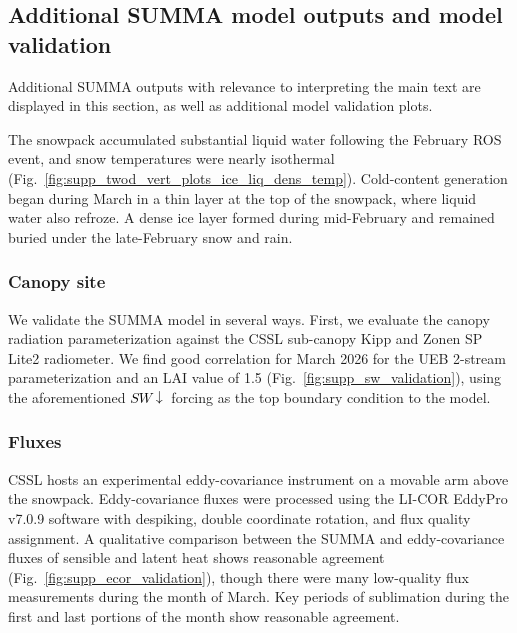 \documentclass[draft,jgrga]{agutexSI2019}
\newcommand{\swdn}{\textcolor{black}{$SW\downarrow$}\xspace}
\begin{document}
\begin{article}
\clearpage

\subsection{Additional SUMMA model outputs and model validation}\label{supp:sec:validation}
Additional SUMMA outputs with relevance to interpreting the main text are displayed in this section, as well as additional model validation plots.

The snowpack accumulated substantial liquid water following the February ROS event, and snow temperatures were nearly isothermal (Fig.~\ref{fig:supp_twod_vert_plots_ice_liq_dens_temp}).
Cold-content generation began during March in a thin layer at the top of the snowpack, where liquid water also refroze.
A dense ice layer formed during mid-February and remained buried under the late-February snow and rain.


\subsubsection{Canopy site}\label{supp:sec:validation:canopy}

We validate the SUMMA model in several ways.
First, we evaluate the canopy radiation parameterization against the CSSL sub-canopy Kipp and Zonen SP Lite2 radiometer.
We find good correlation for March 2026 for the UEB 2-stream parameterization and an LAI value of 1.5 (Fig.~\ref{fig:supp_sw_validation}), using the aforementioned \swdn forcing as the top boundary condition to the model.

\clearpage




\subsubsection{Fluxes}\label{supp:sec:validation:fluxes}
CSSL hosts an experimental eddy-covariance instrument on a movable arm above the snowpack.
Eddy-covariance fluxes were processed using the LI-COR EddyPro v7.0.9 software with despiking, double coordinate rotation, and flux quality assignment.
A qualitative comparison between the SUMMA and eddy-covariance fluxes of sensible and latent heat shows reasonable agreement (Fig.~\ref{fig:supp_ecor_validation}), though there were many low-quality flux measurements during the month of March.
Key periods of sublimation during the first and last portions of the month show reasonable agreement.




\end{article}
\end{document}
